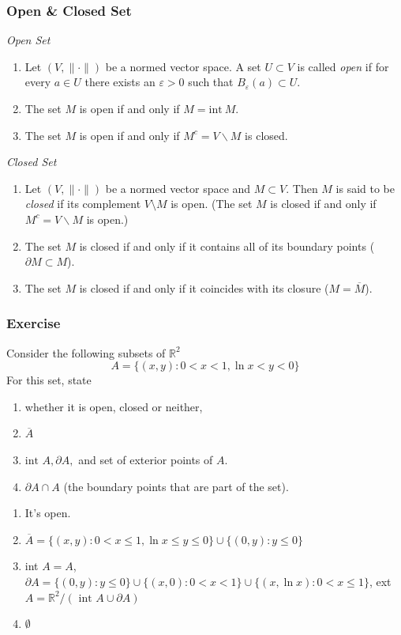 \documentclass[12pt, t]{beamer}
\renewcommand{\emph}[1]{{\color{Turquoise3}\textsl{#1}}}
\begin{document}
\begin{frame}
    \frametitle{Open \& Closed Set}
    \emph{Open Set}
    \begin{enumerate}
        \item Let $(V,\|\cdot\|)$ be a normed vector space. A set $U\subset V$ is called \emph{open} if for every $a\in U$ there exists an $\varepsilon>0$ such that $B_{\varepsilon}(a)\subset U$.
        \item The set $M$ is open if and only if $M=\text{int}~M$.
        \item The set $M$ is open if and only if $M^c=V\backslash M$ is closed.
    \end{enumerate}
    \emph{Closed Set}
    \begin{enumerate}
        \item  Let $(V,\|\cdot\|)$ be a normed vector space and $M\subset V$. Then $M$ is said to be \emph{closed} if its complement $V\setminus M$ is open. (The set $M$ is closed if and only if $M^c=V\backslash M$ is open.)
        \item The set $M$ is closed if and only if it contains all of its boundary points ($\partial M\subset M$).
        \item The set $M$ is closed if and only if it coincides with its closure ($M=\overline{M}$).
    \end{enumerate}
\end{frame}

\begin{frame}
    \frametitle{Exercise}
    Consider the following subsets of $\mathbb{R}^{2}$
    \[
        A=\{(x, y): 0<x<1, \ln x<y<0\}
    \]
    For this set, state
    \begin{enumerate}
        \item whether it is open, closed or neither,
        \item $\overline{A}$
        \item $\text{int }A, \partial A,$ and set of exterior points of $A$.
        \item $\partial A \cap A$ (the boundary points that are part of the set).
    \end{enumerate}

    \pause
    \begin{enumerate}
        \item It's open.
        \item $\overline{A}=\{(x, y): 0<x \leq 1, \ln x \leq y \leq 0\} \cup\{(0, y): y \leq 0\}$
        \item int $A=A$, $\partial A=\{(0, y): y \leq 0\} \cup\{(x, 0): 0<x<1\} \cup\{(x, \ln x): 0<x \leq 1\}$, ext $A=\mathbb{R}^{2} /(\text { int } A \cup \partial A)$
        \item $\emptyset$
    \end{enumerate}
\end{frame}
\end{document}
